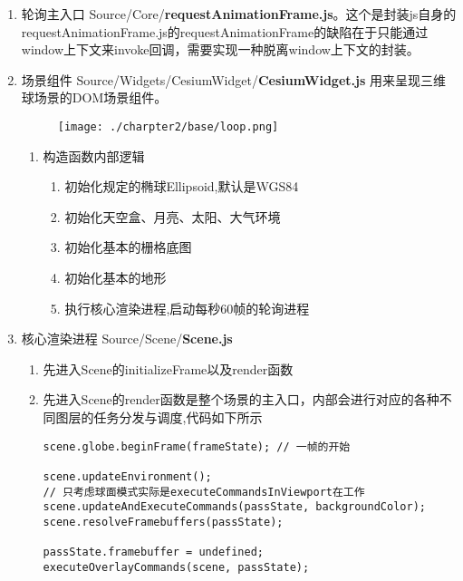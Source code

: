 \begin{enumerate}
	\item 轮询主入口 Source/Core/\textbf{requestAnimationFrame.js}。这个是封装js自身的requestAnimationFrame.js的requestAnimationFrame的缺陷在于只能通过window上下文来invoke回调，需要实现一种脱离window上下文的封装。
	\item 场景组件 Source/Widgets/CesiumWidget/\textbf{CesiumWidget.js} 用来呈现三维球场景的DOM场景组件。
	      \begin{figure}[!htb]
		      \centering
		      \texttt{[image: ./charpter2/base/loop.png]}
	      \end{figure}
	      \begin{enumerate}
		      \item 构造函数内部逻辑
		            \begin{enumerate}
			            \item 初始化规定的椭球Ellipsoid,默认是WGS84
			            \item 初始化天空盒、月亮、太阳、大气环境
			            \item 初始化基本的栅格底图
			            \item 初始化基本的地形
			            \item 执行核心渲染进程,启动每秒60帧的轮询进程
		            \end{enumerate}

	      \end{enumerate}
	\item 核心渲染进程 Source/Scene/\textbf{Scene.js}
	      \begin{enumerate}
		      \item 先进入Scene的initializeFrame以及render函数
		      \item 先进入Scene的render函数是整个场景的主入口，内部会进行对应的各种不同图层的任务分发与调度,代码如下所示
		            \begin{lstlisting}
scene.globe.beginFrame(frameState); // 一帧的开始

scene.updateEnvironment();
// 只考虑球面模式实际是executeCommandsInViewport在工作
scene.updateAndExecuteCommands(passState, backgroundColor); 
scene.resolveFramebuffers(passState);

passState.framebuffer = undefined;
executeOverlayCommands(scene, passState);


\end{lstlisting}
\end{enumerate}
\end{enumerate}
